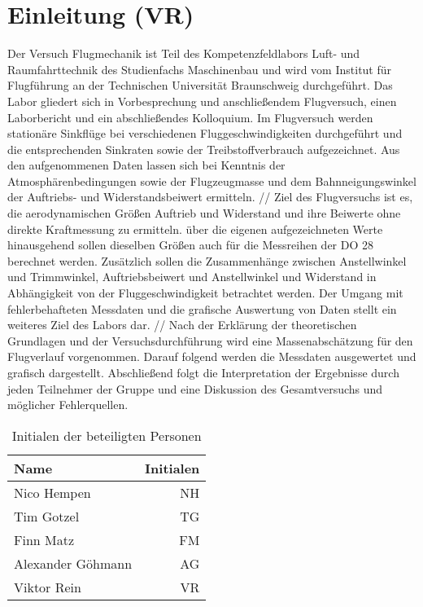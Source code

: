\chapter{Einleitung (VR)}
\label{c:Einleitung}

Der Versuch Flugmechanik ist Teil des Kompetenzfeldlabors Luft- und Raumfahrttechnik des Studienfachs Maschinenbau und wird vom Institut für Flugführung an der Technischen Universität Braunschweig durchgeführt. Das Labor gliedert sich in Vorbesprechung und anschließendem Flugversuch, einen Laborbericht und ein abschließendes Kolloquium. 
Im Flugversuch werden stationäre Sinkflüge bei verschiedenen Fluggeschwindigkeiten durchgeführt und die entsprechenden Sinkraten sowie der Treibstoffverbrauch aufgezeichnet. Aus den aufgenommenen Daten lassen sich bei Kenntnis der Atmosphärenbedingungen sowie der Flugzeugmasse und dem Bahnneigungswinkel der Auftriebs- und Widerstandsbeiwert ermitteln. //
Ziel des Flugversuchs ist es, die aerodynamischen Größen Auftrieb und Widerstand und ihre Beiwerte ohne direkte Kraftmessung zu ermitteln. über die eigenen aufgezeichneten Werte hinausgehend sollen dieselben Größen auch für die Messreihen der DO 28 berechnet werden. Zusätzlich sollen die Zusammenhänge zwischen Anstellwinkel und Trimmwinkel, Auftriebsbeiwert und Anstellwinkel und Widerstand in Abhängigkeit von der Fluggeschwindigkeit betrachtet werden. Der Umgang mit fehlerbehafteten Messdaten und die grafische Auswertung von Daten stellt ein weiteres Ziel des Labors dar. //
Nach der Erklärung der theoretischen Grundlagen und der Versuchsdurchführung wird eine Massenabschätzung für den Flugverlauf vorgenommen. Darauf folgend werden die Messdaten ausgewertet und grafisch dargestellt. Abschließend folgt die Interpretation der Ergebnisse durch jeden Teilnehmer der Gruppe und eine Diskussion des Gesamtversuchs und möglicher Fehlerquellen. 






\begin{table}[h]
	\centering
	\begin{tabular}{lr}
		
		Name & \hspace{0.5cm} Initialen\\
		\hline
		Nico Hempen & NH\\
		Tim Gotzel & TG\\
		Finn Matz & FM\\
		Alexander Göhmann & AG \\
		Viktor Rein & VR\\
		\hline
		
	\end{tabular}
	\caption{Initialen der beteiligten Personen}
	\label{tab:initialien}
\end{table}
